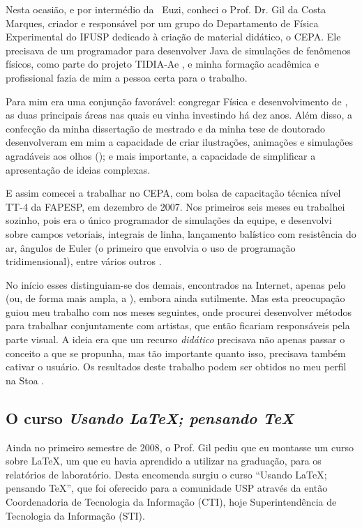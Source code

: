 Nesta ocasião, e por intermédio da \profa\ Euzi, conheci o Prof. Dr. Gil da Costa Marques, criador e responsável por um grupo do Departamento de Física Experimental do IFUSP dedicado à criação de material didático, o CEPA. Ele precisava de um programador para desenvolver  Java de simulações de fenômenos físicos, como parte do projeto TIDIA-Ae \cite{tidia}, e minha formação acadêmica e profissional fazia de mim a pessoa certa para o trabalho.

Para mim era uma conjunção favorável: congregar Física e desenvolvimento de , as duas principais áreas nas quais eu vinha investindo há dez anos. Além disso, a confecção da minha dissertação de mestrado e da minha tese de doutorado desenvolveram em mim a capacidade de criar ilustrações, animações e simulações agradáveis aos olhos (); e mais importante, a capacidade de simplificar a apresentação de ideias complexas.

E assim comecei a trabalhar no CEPA, com bolsa de capacitação técnica nível TT-4 da FAPESP, em dezembro de 2007. Nos primeiros seis meses eu trabalhei sozinho, pois era o único programador de simulações da equipe, e desenvolvi  sobre campos vetoriais, integrais de linha, lançamento balístico com resistência do ar, ângulos de Euler (o primeiro que envolvia o uso de programação tridimensional), entre vários outros \cite{applets}.

No início esses  distinguiam-se dos demais, encontrados na Internet, apenas pelo  (ou, de forma mais ampla, a ), embora ainda sutilmente. Mas esta preocupação guiou meu trabalho com  nos meses seguintes, onde procurei desenvolver métodos para trabalhar conjuntamente com artistas, que então ficariam responsáveis pela parte visual. A ideia era que um recurso \emph{didático} precisava não apenas passar o conceito a que se propunha, mas tão importante quanto isso, precisava também cativar o usuário. Os resultados deste trabalho podem ser obtidos no meu perfil na  Stoa \cite{irpagnossin-stoa}.

\subsection{O curso \textsl{Usando \LaTeX; pensando \TeX}}
\label{sec:latex}

Ainda no primeiro semestre de 2008, o Prof. Gil pediu que eu montasse um curso sobre \LaTeX, um  que eu havia aprendido a utilizar na graduação, para os relatórios de laboratório. Desta encomenda surgiu o curso ``Usando \LaTeX; pensando \TeX'', que foi oferecido para a comunidade USP através da então Coordenadoria de Tecnologia da Informação (CTI), hoje Superintendência de Tecnologia da Informação (STI).

